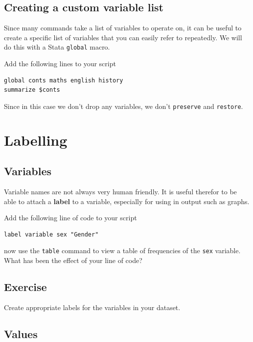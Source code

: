 \documentclass[
]{article}
\begin{document}
\hypertarget{creating-a-custom-variable-list}{%
\subsection{Creating a custom variable list}\label{creating-a-custom-variable-list}}

Since many commands take a list of variables to operate on, it can be useful to create a specific list of variables that you can easily refer to repeatedly. We will do this with a Stata \texttt{global} macro.

Add the following lines to your script

\begin{verbatim}
global conts maths english history
summarize $conts
\end{verbatim}

Since in this case we don't drop any variables, we don't \texttt{preserve} and \texttt{restore}.

\hypertarget{labelling}{%
\section{Labelling}\label{labelling}}

\hypertarget{variables}{%
\subsection{Variables}\label{variables}}

Variable names are not always very human friendly. It is useful therefor to be able to attach a \textbf{label} to a variable, especially for using in output such as graphs.

Add the following line of code to your script

\begin{verbatim}
label variable sex "Gender"
\end{verbatim}

now use the \texttt{table} command to view a table of frequencies of the \texttt{sex} variable. What has been the effect of your line of code?

\hypertarget{exercise-9}{%
\subsection{Exercise}\label{exercise-9}}

Create appropriate labels for the variables in your dataset.

\hypertarget{values}{%
\subsection{Values}\label{values}}
\end{document}

